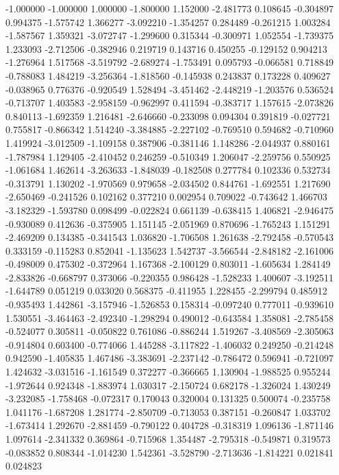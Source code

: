 -1.000000
-1.000000
1.000000
-1.800000
1.152000
-2.481773
0.108645
-0.304897
0.994375
-1.575742
1.366277
-3.092210
-1.354257
0.284489
-0.261215
1.003284
-1.587567
1.359321
-3.072747
-1.299600
0.315344
-0.300971
1.052554
-1.739375
1.233093
-2.712506
-0.382946
0.219719
0.143716
0.450255
-0.129152
0.904213
-1.276964
1.517568
-3.519792
-2.689274
-1.753491
0.095793
-0.066581
0.718849
-0.788083
1.484219
-3.256364
-1.818560
-0.145938
0.243837
0.173228
0.409627
-0.038965
0.776376
-0.920549
1.528494
-3.451462
-2.448219
-1.203576
0.536524
-0.713707
1.403583
-2.958159
-0.962997
0.411594
-0.383717
1.157615
-2.073826
0.840113
-1.692359
1.216481
-2.646660
-0.233098
0.094304
0.391819
-0.027721
0.755817
-0.866342
1.514240
-3.384885
-2.227102
-0.769510
0.594682
-0.710960
1.419924
-3.012509
-1.109158
0.387906
-0.381146
1.148286
-2.044937
0.880161
-1.787984
1.129405
-2.410452
0.246259
-0.510349
1.206047
-2.259756
0.550925
-1.061684
1.462614
-3.263633
-1.848039
-0.182508
0.277784
0.102336
0.532734
-0.313791
1.130202
-1.970569
0.979658
-2.034502
0.844761
-1.692551
1.217690
-2.650469
-0.241526
0.102162
0.377210
0.002954
0.709022
-0.743642
1.466703
-3.182329
-1.593780
0.098499
-0.022824
0.661139
-0.638415
1.406821
-2.946475
-0.930089
0.412636
-0.375905
1.151145
-2.051969
0.870696
-1.765243
1.151291
-2.469209
0.134385
-0.341543
1.036820
-1.706508
1.261638
-2.792458
-0.570543
0.333159
-0.115283
0.852041
-1.135623
1.542737
-3.566544
-2.848182
-2.161006
-0.498009
0.475302
-0.372964
1.167368
-2.100129
0.803011
-1.605634
1.284149
-2.833826
-0.668797
0.373066
-0.220355
0.986428
-1.528233
1.400607
-3.192511
-1.644789
0.051219
0.033020
0.568375
-0.411955
1.228455
-2.299794
0.485912
-0.935493
1.442861
-3.157946
-1.526853
0.158314
-0.097240
0.777011
-0.939610
1.530551
-3.464463
-2.492340
-1.298294
0.490012
-0.643584
1.358081
-2.785458
-0.524077
0.305811
-0.050822
0.761086
-0.886244
1.519267
-3.408569
-2.305063
-0.914804
0.603400
-0.774066
1.445288
-3.117822
-1.406032
0.249250
-0.214248
0.942590
-1.405835
1.467486
-3.383691
-2.237142
-0.786472
0.596941
-0.721097
1.424632
-3.031516
-1.161549
0.372277
-0.366665
1.130904
-1.988525
0.955244
-1.972644
0.924348
-1.883974
1.030317
-2.150724
0.682178
-1.326024
1.430249
-3.232085
-1.758468
-0.072317
0.170043
0.320004
0.131325
0.500074
-0.235758
1.041176
-1.687208
1.281774
-2.850709
-0.713053
0.387151
-0.260847
1.033702
-1.673414
1.292670
-2.881459
-0.790122
0.404728
-0.318319
1.096136
-1.871146
1.097614
-2.341332
0.369864
-0.715968
1.354487
-2.795318
-0.549871
0.319573
-0.083852
0.808344
-1.014230
1.542361
-3.528790
-2.713636
-1.814221
0.021841
0.024823
